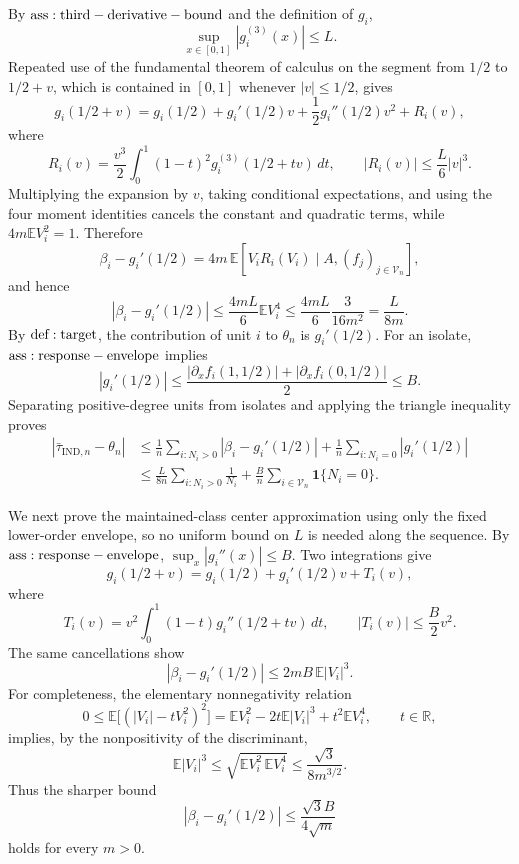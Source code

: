 By \({\rm ass:third-derivative-bound}\) and the definition of \(g_i\),
\[
 \sup_{x\in[0,1]}|g_i^{(3)}(x)|\le L.
\]
Repeated use of the fundamental theorem of calculus on the segment from \(1/2\) to \(1/2+v\), which is contained in \([0,1]\) whenever \(|v|\le1/2\), gives
\[
 g_i(1/2+v)
 =g_i(1/2)+g_i'(1/2)v+\frac12g_i''(1/2)v^2+R_i(v),
\]
where
\[
 R_i(v)=\frac{v^3}{2}\int_0^1(1-t)^2g_i^{(3)}(1/2+tv)\,dt,
 \qquad
 |R_i(v)|\le\frac L6|v|^3.
\]
Multiplying the expansion by \(v\), taking conditional expectations, and using the four moment identities cancels the constant and quadratic terms, while \(4m\mathbb E V_i^2=1\).  Therefore
\[
 \beta_i-g_i'(1/2)
 =4m\,\mathbb E\!\left[V_iR_i(V_i)\mid A,(f_j)_{j\in\mathcal V_n}\right],
\]
and hence
\[
 |\beta_i-g_i'(1/2)|
 \le\frac{4mL}{6}\mathbb E V_i^4
 \le\frac{4mL}{6}\frac3{16m^2}
 =\frac{L}{8m}.
\]
By \({\rm def:target}\), the contribution of unit \(i\) to \(\theta_n\) is \(g_i'(1/2)\).  For an isolate, \({\rm ass:response-envelope}\) implies
\[
 |g_i'(1/2)|
 \le\frac{|\partial_xf_i(1,1/2)|+|\partial_xf_i(0,1/2)|}{2}
 \le B.
\]
Separating positive-degree units from isolates and applying the triangle inequality proves
\[
\begin{aligned}
 |\bar\tau_{\mathrm{IND},n}-\theta_n|
 &\le\frac1n\sum_{i:N_i>0}|\beta_i-g_i'(1/2)|
       +\frac1n\sum_{i:N_i=0}|g_i'(1/2)|\\
 &\le\frac{L}{8n}\sum_{i:N_i>0}\frac1{N_i}
       +\frac Bn\sum_{i\in\mathcal V_n}\mathbf1\{N_i=0\}.
\end{aligned}
\]

We next prove the maintained-class center approximation using only the fixed lower-order envelope, so no uniform bound on \(L\) is needed along the sequence.  By \({\rm ass:response-envelope}\), \(\sup_x|g_i''(x)|\le B\).  Two integrations give
\[
 g_i(1/2+v)=g_i(1/2)+g_i'(1/2)v+T_i(v),
\]
where
\[
 T_i(v)=v^2\int_0^1(1-t)g_i''(1/2+tv)\,dt,
 \qquad
 |T_i(v)|\le\frac B2v^2.
\]
The same cancellations show
\[
 |\beta_i-g_i'(1/2)|\le2mB\,\mathbb E|V_i|^3.
\]
For completeness, the elementary nonnegativity relation
\[
 0\le\mathbb E\bigl[(|V_i|-tV_i^2)^2\bigr]
 =\mathbb EV_i^2-2t\mathbb E|V_i|^3+t^2\mathbb EV_i^4,
 \qquad t\in\mathbb R,
\]
implies, by the nonpositivity of the discriminant,
\[
 \mathbb E|V_i|^3\le
 \sqrt{\mathbb EV_i^2\,\mathbb EV_i^4}
 \le\frac{\sqrt3}{8m^{3/2}}.
\]
Thus the sharper bound
\[
 |\beta_i-g_i'(1/2)|\le\frac{\sqrt3 B}{4\sqrt m}
\]
holds for every \(m>0\).

